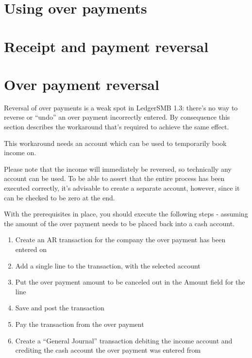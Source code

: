 
\section{Using over payments}
\label{sec-business-processes-payment-processing-overpayments}

\section{Receipt and payment reversal}
\label{sec-business-processes-payment-processing-reversal}

\section{Over payment reversal}
\label{sec-business-processes-payment-processing-overpayment-reversal}

Reversal of over payments is a weak spot in LedgerSMB 1.3: there's no way
to reverse or ``undo'' an over payment incorrectly entered.  By consequence
this section describes the workaround that's required to achieve the same
effect.

This workaround needs an account which can be used to temporarily book income on.

Please note that the income will immediately be reversed, so
technically any account can be used.  To be able to assert that the entire process
has been executed correctly, it's advisable to create a separate account, however, since
it can be checked to be zero at the end.

With the prerequisites in place, you should execute the following steps - assuming the amount
of the over payment needs to be placed back into a cash account.

\begin{enumerate}
\item \label{itm:StartSetupOverpaymentCancelation} Create an AR transaction for the
    company the over payment has been entered on
\item Add a single line to the transaction, with the selected account
\item Put the over payment amount to be canceled out in the Amount field for the line
\item \label{itm:EndSetupOverpaymentCancelation} Save and post the transaction
\item \label{itm:OverpaymentCancelation} Pay the transaction from the over payment
\item \label{itm:MoveToCashAccount} Create a ``General Journal'' transaction debiting the income account and crediting the
    cash account the over payment was entered from
\end{enumerate}

